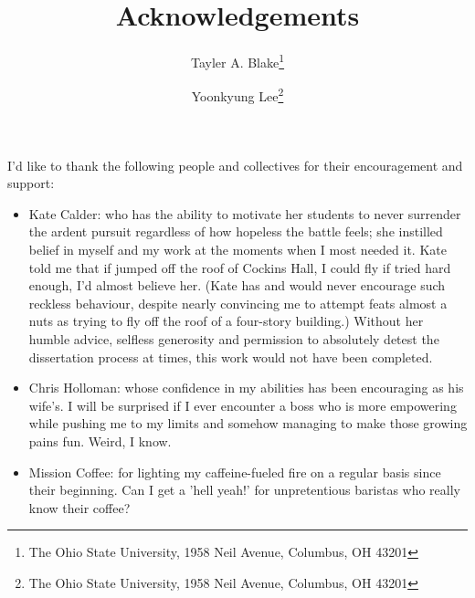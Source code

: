\documentclass[12pt]{article}
\title{ Acknowledgements}
\author{Tayler A. Blake\thanks{The Ohio State University, 1958 Neil Avenue, Columbus, OH 43201} \and  Yoonkyung Lee\thanks{The Ohio State University, 1958 Neil Avenue, Columbus, OH 43201}}
\begin{document}

\maketitle


I'd like to thank the following people and collectives for their encouragement and support:

\begin{itemize}

\item Kate Calder: who has the ability to motivate her students to never surrender the ardent pursuit regardless of how hopeless the battle feels; she instilled belief in myself and my work at the moments when I most needed it. Kate told me that if jumped off the roof of Cockins Hall, I could fly if tried hard enough, I'd almost believe her. (Kate has and would never encourage such reckless behaviour, despite nearly convincing me to attempt feats almost a nuts as trying to fly off the roof of a four-story building.) Without her humble advice, selfless generosity and permission to absolutely detest the dissertation process at times, this work would not have been completed.

\item Chris Holloman: whose confidence in my abilities has been encouraging as his wife's. I will be surprised if I ever encounter a boss who is more empowering while pushing me to my limits and somehow managing to make those growing pains fun. Weird, I know.

\item Mission Coffee: for lighting my caffeine-fueled fire on a regular basis since their beginning. Can I get a 'hell yeah!' for unpretentious baristas who really know their coffee?

\end{itemize} 
\end{document}
